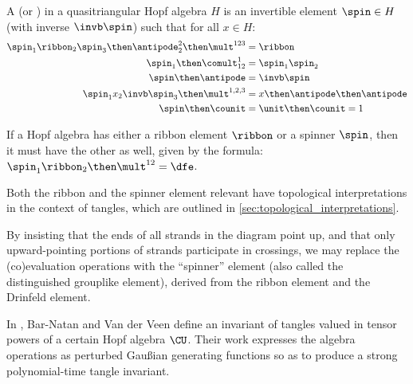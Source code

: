 \begin{definition}
        A  (or ) in a
        quasitriangular Hopf algebra $H$ is an invertible element $\spin\in H$
        (with inverse $\invb\spin$) such that for all $x\in H$:
        \begin{align}
                \label{eq:spinner_ribbon}
                \spin_1\ribbon_2\spin_3 \then \antipode^2_2 \then \mult^{123} &=
                \ribbon\\
                \label{eq:spinner_comult}
                \spin_1\then\comult^{1}_{12} &=\spin_1\spin_2\\
                \label{eq:spinner_antipode}
                \spin \then\antipode &= \invb\spin\\
                \label{eq:spinner_conjugate}
                \spin_{1}x_2\invb\spin_{3}\then\mult^{1,2,3} &=
                x \then \antipode \then \antipode\\
                \label{eq:spinner_counit}
                \spin \then \counit &= \unit \then \counit = 1
        \end{align}
\end{definition}

\begin{lemma}\label{lem:spinner_ribbon}
        If a Hopf algebra has either a ribbon element $\ribbon$ or a spinner
        $\spin$, then it must have the other as well, given by the formula:
        $\spin_1 \ribbon_2 \then \mult^{12} = \dfe$.
\end{lemma}

Both the ribbon and the spinner element relevant have topological
interpretations in the context of tangles, which are outlined in
\cref{sec:topological_interpretations}.



\begin{remark}
        By insisting that the ends of all strands in the diagram point up, and
        that only upward-pointing portions of strands participate in crossings,
        we may replace the (co)evaluation operations with the \enquote{spinner}
        element (also called the distinguished grouplike element), derived from
        the ribbon element and the Drinfeld element.
\end{remark}
In \cite{BV}, Bar-Natan and Van der Veen define an invariant of tangles valued
in tensor powers of a certain Hopf algebra $\CU$. Their work expresses the
algebra operations as perturbed Gaußian generating functions so as to produce a
strong polynomial-time tangle invariant.
